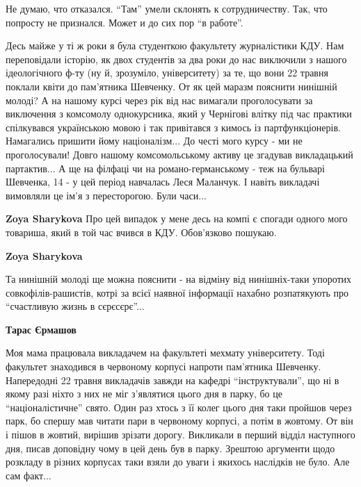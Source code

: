  
 
 
 
 
\zzSecCmt

\begin{itemize} %

Не думаю, что отказался. \enquote{Там} умели склонять к сотрудничеству. Так, что
попросту не признался. Может и до сих пор \enquote{в работе}.


Десь майже у ті ж роки я була студенткою факультету журналістики КДУ. Нам
переповідали історію, як двох студентів за два роки до нас виключили з нашого
ідеологічного ф-ту (ну й, зрозуміло, університету) за те, що вони 22 травня
поклали квіти до пам'ятника Шевченку. От як цей маразм пояснити нинішній
молоді? А на нашому курсі через рік від нас вимагали проголосувати за
виключення з комсомолу однокурсника, який у Чернігові влітку під час практики
спілкувався українською мовою і так привітався з кимось із партфункціонерів.
Намагались пришити йому націоналізм... До честі мого курсу - ми не
проголосували! Довго нашому комсомольському активу це згадував викладацький
партактив... А ще на філфаці чи на романо-германському - теж на бульварі
Шевченка, 14 - у цей період навчалась Леся Маланчук. І навіть викладачі
вимовляли це ім'я з пересторогою. Були часи...

\begin{itemize} %
\textbf{Zoya Sharykova} Про цей випадок у мене десь на компі є спогади одного мого товариша, який в той час вчився в КДУ. Обов'язково пошукаю.

\textbf{Zoya Sharykova} 

Та нинішній молоді ще можна пояснити - на відміну від нинішніх-таки упоротих
совкофілів-рашистів, котрі за всієї наявної інформації нахабно розпатякують про
\enquote{счастливую жизнь в сєрєсєрє}...

\begin{itemize} %
\textbf{Тарас Єрмашов} 

Моя мама працювала викладачем на факультеті мехмату університету. Тоді
факультет знаходився в червоному корпусі напроти пам'ятника Шевченку.
Напередодні 22 травня викладачів завжди на кафедрі \enquote{інструктували}, що ні в
якому разі ніхто з них не міг з'являтися цього дня в парку, бо це
\enquote{націоналістичне} свято. Один раз хтось з її колег цього дня таки пройшов через
парк, бо спершу мав читати пари в червоному корпусі, а потім в жовтому. От він
і пішов в жовтий, вирішив зрізати дорогу. Викликали в перший відділ наступного
дня, писав доповідну чому в цей день був в парку. Зрештою аргументи щодо
розкладу в різних корпусах таки взяли до уваги і якихось наслідків не було. Але
сам факт...


\end{itemize}
\end{itemize}
\end{itemize}

